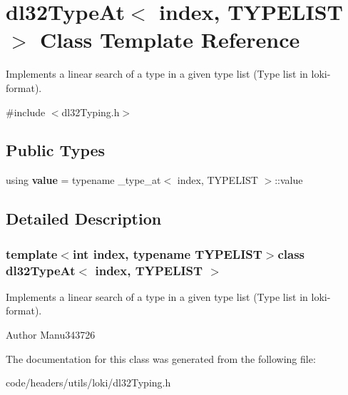 \hypertarget{classdl32_type_at}{\section{dl32\-Type\-At$<$ index, T\-Y\-P\-E\-L\-I\-S\-T $>$ Class Template Reference}
\label{classdl32_type_at}
}


Implements a linear search of a type in a given type list (Type list in loki-\/format).  




{\ttfamily \#include $<$dl32\-Typing.\-h$>$}

\subsection*{Public Types}
\begin{DoxyCompactItemize}
\item 
\hypertarget{classdl32_type_at_ac65f8a3b7ae4f3c4ebdfede46ce718e8}{using {\bfseries value} = typename \-\_\-type\-\_\-at$<$ index, T\-Y\-P\-E\-L\-I\-S\-T $>$\-::value}\label{classdl32_type_at_ac65f8a3b7ae4f3c4ebdfede46ce718e8}

\end{DoxyCompactItemize}


\subsection{Detailed Description}
\subsubsection*{template$<$int index, typename T\-Y\-P\-E\-L\-I\-S\-T$>$class dl32\-Type\-At$<$ index, T\-Y\-P\-E\-L\-I\-S\-T $>$}

Implements a linear search of a type in a given type list (Type list in loki-\/format). 

\begin{DoxyAuthor}{Author}
Manu343726 
\end{DoxyAuthor}


The documentation for this class was generated from the following file\-:\begin{DoxyCompactItemize}
\item 
code/headers/utils/loki/dl32\-Typing.\-h\end{DoxyCompactItemize}

